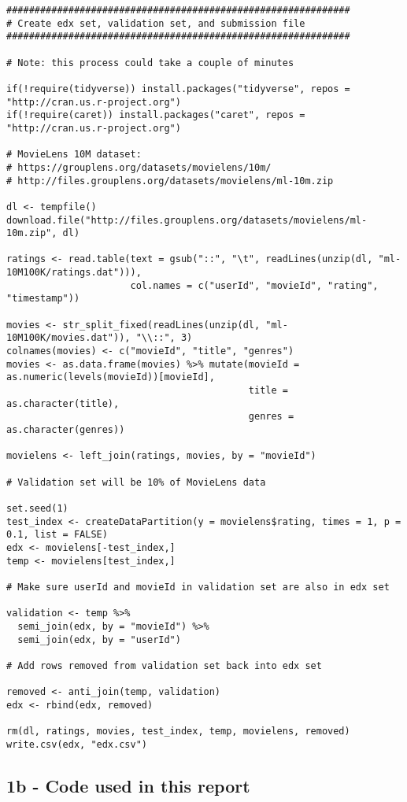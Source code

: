 \documentclass[]{article}
\begin{document}
\begin{verbatim}
#############################################################
# Create edx set, validation set, and submission file
#############################################################

# Note: this process could take a couple of minutes

if(!require(tidyverse)) install.packages("tidyverse", repos = "http://cran.us.r-project.org")
if(!require(caret)) install.packages("caret", repos = "http://cran.us.r-project.org")

# MovieLens 10M dataset:
# https://grouplens.org/datasets/movielens/10m/
# http://files.grouplens.org/datasets/movielens/ml-10m.zip

dl <- tempfile()
download.file("http://files.grouplens.org/datasets/movielens/ml-10m.zip", dl)

ratings <- read.table(text = gsub("::", "\t", readLines(unzip(dl, "ml-10M100K/ratings.dat"))),
                      col.names = c("userId", "movieId", "rating", "timestamp"))

movies <- str_split_fixed(readLines(unzip(dl, "ml-10M100K/movies.dat")), "\\::", 3)
colnames(movies) <- c("movieId", "title", "genres")
movies <- as.data.frame(movies) %>% mutate(movieId = as.numeric(levels(movieId))[movieId],
                                           title = as.character(title),
                                           genres = as.character(genres))

movielens <- left_join(ratings, movies, by = "movieId")

# Validation set will be 10% of MovieLens data

set.seed(1)
test_index <- createDataPartition(y = movielens$rating, times = 1, p = 0.1, list = FALSE)
edx <- movielens[-test_index,]
temp <- movielens[test_index,]

# Make sure userId and movieId in validation set are also in edx set

validation <- temp %>% 
  semi_join(edx, by = "movieId") %>%
  semi_join(edx, by = "userId")

# Add rows removed from validation set back into edx set

removed <- anti_join(temp, validation)
edx <- rbind(edx, removed)

rm(dl, ratings, movies, test_index, temp, movielens, removed)
write.csv(edx, "edx.csv")
\end{verbatim}

\hypertarget{b---code-used-in-this-report}{%
\subsection{1b - Code used in this
report}\label{b---code-used-in-this-report}}
\end{document}
